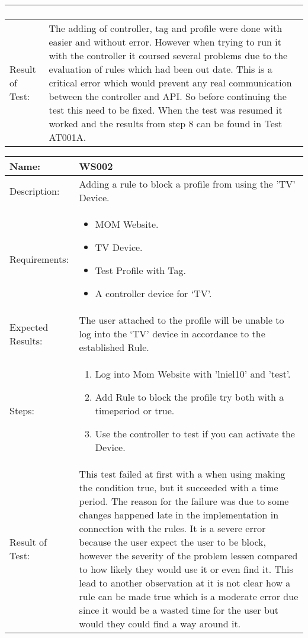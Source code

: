 \begin{table}[h]
\begin{tabular*}{\textwidth}{|l|l|}
{\begin{enumerate}
		\end{enumerate}}
		\\		
		\hline
		Result of Test: & \parbox{.70\textwidth}{The adding of controller, tag and profile were done with easier and without error. However when trying to run it with the controller it coursed several problems due to the evaluation of rules which had been out date. This is a critical error which would prevent any real communication between the controller and API. So before continuing the test this need to be fixed. When the test was resumed it worked and the results from step 8 can be found in Test AT001A.} \\
		\hline
		\end{tabular*}
\end{table}



\begin{table}[h]
	\centering
		\begin{tabular*}{\textwidth}{|l|l|}
		\hline
		\hline
		Name: & WS002\\
		\hline
		Description: & \parbox{0.70\textwidth}{Adding a rule to block a profile from using the 'TV' Device.}\\
		\hline
		Requirements: & \parbox{0.70\textwidth}{
		\begin{itemize}
			\item MOM Website.
			\item TV Device.
			\item Test Profile with Tag.
			\item A controller device for `TV'.
		\end{itemize}}
		\\
		\hline
		Expected Results: & \parbox{.70\textwidth}{The user attached to the profile will be unable to log into the `TV' device in accordance to the established Rule.}\\
		\hline
		Steps: & \parbox{.70\textwidth}{
		\begin{enumerate}
			\item Log into Mom Website with 'lniel10' and 'test'.
			\item Add Rule to block the profile try both with a timeperiod or true.
			\item Use the controller to test if you can activate the Device.
		\end{enumerate}}
		\\		
		\hline
		Result of Test: &  \parbox{.70\textwidth}{This test failed at first with a when using making the condition true, but it succeeded with a time period. The reason for the failure was due to some changes happened late in the implementation in connection with the rules. It is a severe error because the user expect the user to be block, however the severity of the problem lessen compared to how likely they would use it or even find it. This lead to another observation at it is not clear how a rule can be made true which is a moderate error due since it would be a wasted time for the user but would they could find a way around it.}\\
		\hline
		\end{tabular*}
\end{table}


